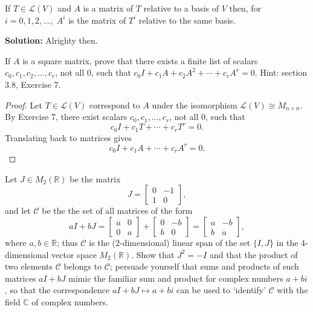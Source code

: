 \begin{tcolorbox}[title=Exercise 1, breakable]
    If $T \in \mathcal{L}(V)$ and $A$ is a matrix of $T$ relative to a basis of $V$ then,
    for $i = 0, 1, 2, \ldots,$ $A^i$ is the matrix of $T^i$ relative to the same basis.
\end{tcolorbox}

\textbf{Solution: } Alrighty then.

\begin{tcolorbox}[title=Exercise 2, breakable]
    If $A$ is a square matrix, prove that there exists a finite list of scalars 
    $c_0, c_1, c_2, \ldots, c_r$, not all $0$, such that $c_0 I + c_1 A + c_2 A^2 + \cdots + c_r A^r = 0$.
    {Hint: section 3.8, Exercise 7.}
\end{tcolorbox}

\begin{proof}
    Let $T \in \mathcal{L}(V)$ correspond to $A$ under the isomorphism 
    $\mathcal{L}(V) \cong M_{n \times n}$. By Exercise 7, there exist scalars 
    $c_0, c_1, \dots, c_r$, not all $0$, such that
    \[
        c_0 I + c_1 T + \cdots + c_r T^r = 0.
    \]
    Translating back to matrices gives
    \[
        c_0 I + c_1 A + \cdots + c_r A^r = 0.
    \]
\end{proof}

\begin{tcolorbox}[title=Exercise 5, breakable]
    Let $J \in M_2(\mathbb{R})$ be the matrix 
    \[
    J = 
    \begin{bmatrix}
        0 & -1 \\ 1 & 0
    \end{bmatrix},
    \]
    and let $\mathcal{C}$ be the the set of all matrices of the form 
    \[a I + b J = 
    \begin{bmatrix}
        a & 0 \\ 0 & a
    \end{bmatrix} + 
    \begin{bmatrix}
        0 & -b \\ b & 0
    \end{bmatrix} = 
    \begin{bmatrix}
        a & -b \\ b & a
    \end{bmatrix}
    ,\]
    where $a, b \in \mathbb{R}$; thus $\mathcal{C}$
    is the ($2$-dimensional) linear span of the set 
    $\{I, J\}$ in the $4$-dimensional vector space $M_2(\mathbb{R})$.
    Show that $J^2 = -I$ and that the product of two elements $\mathcal{C}$ 
    belongs to $\mathcal{C}$; persuade yourself that sums and products 
    of such matrices $a I + b J$ mimic the familiar sum and product for complex 
    numbers $a + bi$, so that the correspondence 
    $a I + b J \mapsto a + bi$ can be used to `identify'
    $\mathcal{C}$ with the field $\mathbb{C}$ of complex numbers.
\end{tcolorbox}

